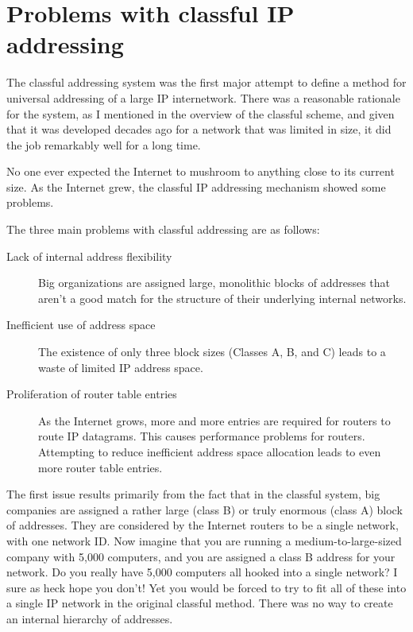 \documentclass[b5paper,11pt]{memoir}
\begin{document}
\section{Problems with classful IP addressing}

The classful addressing system was the first major attempt to define a
method for universal addressing of a large IP internetwork. There was a
reasonable rationale for the system, as I mentioned in the overview of
the classful scheme, and given that it was developed decades ago for a
network that was limited in size, it did the job remarkably well for a
long time.

No one ever expected the Internet to mushroom to anything close to its
current size. As the Internet grew, the classful IP addressing mechanism
showed some problems.

The three main problems with classful addressing are as follows:
\begin{description}
   \item[Lack of internal address flexibility]
      Big organizations are assigned large, monolithic blocks of addresses that aren't a good match for the structure of their underlying internal networks.

   \item[Inefficient use of address space]
      The existence of only three block sizes (Classes A, B, and C) leads to a waste of limited IP address space.

   \item[Proliferation of router table entries]
      As the Internet grows, more and more entries are required for routers to route IP datagrams.
      This causes performance problems for routers.
      Attempting to reduce inefficient address space allocation leads to even more router table entries.
\end{description}

The first issue results primarily from the fact that in the classful
system, big companies are assigned a rather large (class B) or truly
enormous (class A) block of addresses. They are considered by the
Internet routers to be a single network, with one network ID. Now
imagine that you are running a medium-to-large-sized company with 5,000
computers, and you are assigned a class B address for your network. Do
you really have 5,000 computers all hooked into a single network? I sure
as heck hope you don't! Yet you would be forced to try to fit all of
these into a single IP network in the original classful method. There
was no way to create an internal hierarchy of addresses.
\end{document}
